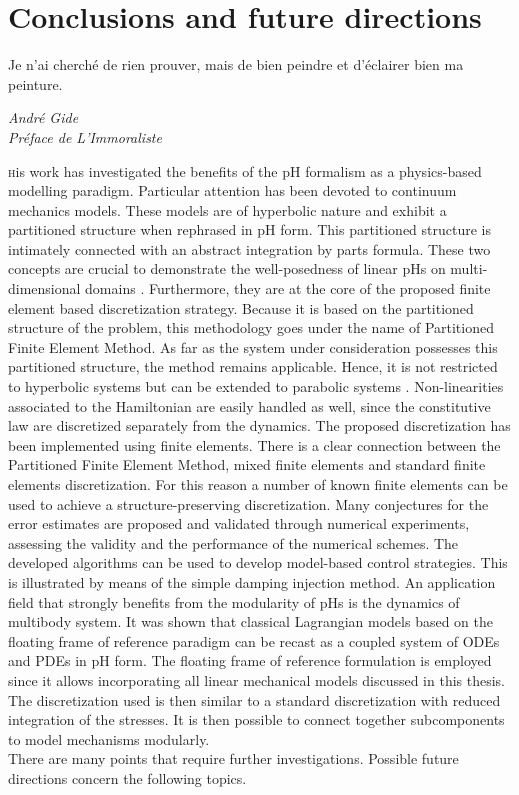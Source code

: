 \chapter*{Conclusions and future directions}

\epigraph{Je n’ai cherché de rien prouver, mais de bien peindre et d’éclairer bien ma peinture.}{\textit{André Gide \\ Préface de L'Immoraliste}}

\lettrine{\color{theme}{T}}his work has investigated the benefits of the pH formalism as a physics-based modelling paradigm. Particular attention has been devoted to continuum mechanics models. These models are of hyperbolic nature and exhibit a partitioned structure when rephrased in  pH form. This partitioned structure is intimately connected with an abstract integration by parts formula. These two concepts are crucial to demonstrate the well-posedness of linear pHs on multi-dimensional domains \cite{skrepek2019wellposedness}. Furthermore, they are at the core of the proposed finite element based discretization strategy. Because it is based on the partitioned structure of the problem, this methodology goes under the name of Partitioned Finite Element Method. As far as the system under consideration possesses this partitioned structure, the method remains applicable. Hence, it is not restricted to  hyperbolic systems but can be extended to parabolic systems \cite{serhani2019discretization}. Non-linearities associated to the Hamiltonian are easily handled as well, since the constitutive law are discretized separately from the dynamics. The proposed discretization has been implemented using finite elements. There is a clear connection between the Partitioned Finite Element Method, mixed finite elements and standard finite elements discretization. For this reason a number of known finite elements can be used to achieve a structure-preserving discretization. Many conjectures for the error estimates are proposed and validated through numerical experiments, assessing the validity and the performance of the numerical schemes. The developed algorithms can be used to develop model-based control strategies. This is illustrated by means of the simple damping injection method. An application field that strongly benefits from the modularity of pHs is the dynamics of multibody system. It was shown that classical Lagrangian models based on the floating frame of reference paradigm can be recast as a coupled system of ODEs and PDEs in pH form. The floating frame of reference formulation is employed since it allows incorporating all linear mechanical models discussed in this thesis. The discretization used is then similar to a standard discretization with reduced integration of the stresses. It is then possible to connect together subcomponents to model mechanisms modularly. \\ There are many points that require further investigations. Possible future directions concern the following topics.



